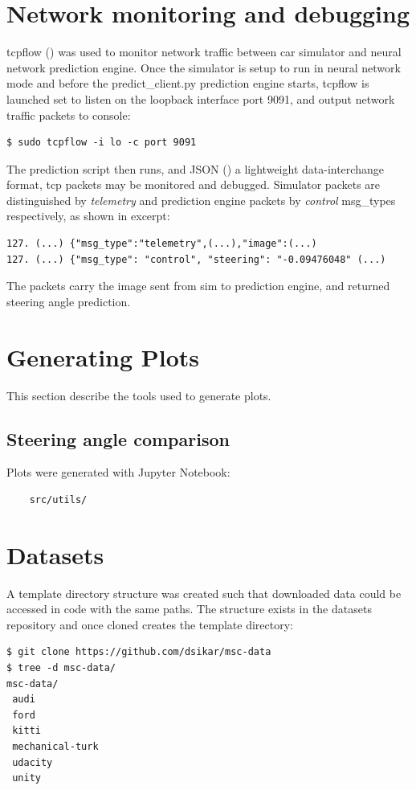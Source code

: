\section{Network monitoring and debugging}
\label{NetMonDebug}
tcpflow (\cite{garfinkel2013passive}) was used to monitor network traffic between car simulator and neural network prediction engine. Once the simulator is setup to run in neural network mode and before the predict\_client.py prediction engine starts, tcpflow is launched set to listen on the loopback interface port 9091, and output network traffic packets to console:
\begin{verbatim}
$ sudo tcpflow -i lo -c port 9091
\end{verbatim}
The prediction script then runs, and JSON (\cite{pezoa2016foundations}) a lightweight data-interchange format, tcp packets may be monitored and debugged. Simulator packets are distinguished by \textit{telemetry} and prediction engine packets by \textit{control} msg\_types respectively, as shown in excerpt:
\begin{verbatim}
127. (...) {"msg_type":"telemetry",(...),"image":(...)
127. (...) {"msg_type": "control", "steering": "-0.09476048" (...)
\end{verbatim}
The packets carry the image sent from sim to prediction engine, and returned steering angle prediction.

\section{Generating Plots}

This section describe the tools used to generate plots.

\subsection{Steering angle comparison}

Plots were generated with Jupyter Notebook:
\begin{verbatim}
    src/utils/
\end{verbatim}

\section{Datasets}

A template directory structure was created such that downloaded data could be accessed in code with the same paths. The structure exists in the datasets repository and once cloned creates the template directory:
\begin{verbatim}
$ git clone https://github.com/dsikar/msc-data
$ tree -d msc-data/
msc-data/
 audi
 ford
 kitti
 mechanical-turk
 udacity
 unity
\end{verbatim}

